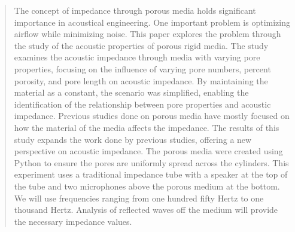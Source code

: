 \begin{abstract}
The concept of impedance through porous media holds significant importance in acoustical engineering. 
One important problem is optimizing airflow while minimizing noise. 
This paper explores the problem through the study of the acoustic properties of porous rigid media. 
The study examines the acoustic impedance through media with varying pore properties, focusing on the influence of varying pore numbers, percent porosity, and pore length on acoustic impedance. 
By maintaining the material as a constant, the scenario was simplified, enabling the identification of the relationship between pore properties and acoustic impedance. 
Previous studies done on porous media have mostly focused on how the material of the media affects the impedance. 
The results of this study expands the work done by previous studies, offering a new perspective on acoustic impedance. 
The porous media were created using Python to ensure the pores are uniformly spread across the cylinders. 
This experiment uses a traditional impedance tube with a speaker at the top of the tube and two microphones above the porous medium at the bottom. 
We will use frequencies ranging from one hundred fifty Hertz to one thousand Hertz. 
Analysis of reflected waves off the medium will provide the necessary impedance values.  
\end{abstract}

